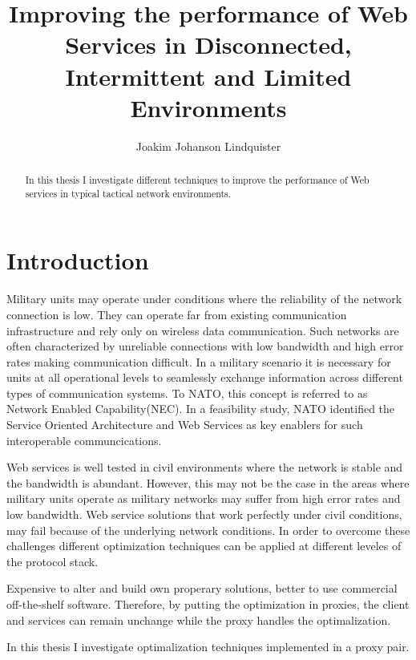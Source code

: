 \documentclass[USenglish]{article}
\title{Improving the performance of Web Services in Disconnected, Intermittent and Limited Environments}
\author{Joakim Johanson Lindquister}
\begin{document}
\ififorside{}

\begin{abstract}
In this thesis I investigate different techniques to improve the performance of Web services in typical tactical network environments.
\end{abstract}
\pagebreak

\tableofcontents
\listoftables
\listoffigures

\pagebreak


\part{Introduction}
Military units may operate under conditions where the reliability of the network connection is low. They can operate far from existing communication infrastructure and rely only on wireless data communication. Such networks are often characterized by unreliable connections with low bandwidth and high error rates making communication difficult. In a military scenario it is necessary for units at all operational levels to seamlessly exchange information across different types of communication systems. To NATO, this concept is referred to as Network Enabled Capability(NEC). In a feasibility study, NATO identified the Service Oriented Architecture and Web Services as key enablers\cite{nnec-study} for such interoperable communcications.

Web services is well tested in civil environments where the network is stable and the bandwidth is abundant. However, this may not be the case in the areas where military units operate as military networks may suffer from high error rates and low bandwidth. Web service solutions that work perfectly under civil conditions, may fail because of the underlying network conditions. In order to overcome these challenges different optimization techniques can be applied at different leveles of the protocol stack. 


Expensive to alter and build own properary solutions, better to use commercial off-the-shelf software. Therefore, by putting the optimization in proxies, the client and services can remain unchange while the proxy handles the optimalization.

In this thesis I investigate optimalization techniques implemented in a proxy pair.
\end{document}
